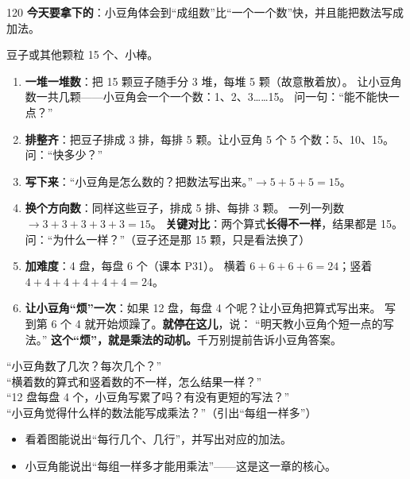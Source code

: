 \begin{lesson}{1}{20}
\textbf{今天要拿下的}：小豆角体会到“成组数”比“一个一个数”快，并且能把数法写成加法。

\begin{materials}
豆子或其他颗粒 15 个、小棒。
\end{materials}

\begin{enumerate}
  \item \textbf{一堆一堆数}：把 15 颗豆子随手分 3 堆，每堆 5 颗（故意散着放）。
        让小豆角数一共几颗——小豆角会一个一个数：1、2、3……15。
        问一句：“能不能快一点？”
  \item \textbf{排整齐}：把豆子排成 3 排，每排 5 颗。让小豆角 5 个 5 个数：5、10、15。
        问：“快多少？”
  \item \textbf{写下来}：“小豆角是怎么数的？把数法写出来。”$\to 5+5+5=15$。
  \item \textbf{换个方向数}：同样这些豆子，排成 5 排、每排 3 颗。
        一列一列数 $\to 3+3+3+3+3=15$。
        \textbf{关键对比}：两个算式\textbf{长得不一样}，结果都是 15。
        问：“为什么一样？”（豆子还是那 15 颗，只是看法换了）
  \item \textbf{加难度}：4 盘，每盘 6 个（课本 P31）。
        横着 $6+6+6+6=24$；竖着 $4+4+4+4+4+4=24$。
  \item \textbf{让小豆角“烦”一次}：如果 12 盘，每盘 4 个呢？让小豆角把算式写出来。
        写到第 6 个 4 就开始烦躁了。\textbf{就停在这儿}，说：
        “明天教小豆角个短一点的写法。”
        \textbf{这个“烦”，就是乘法的动机。}千万别提前告诉小豆角答案。
\end{enumerate}

\begin{saybox}
“小豆角数了几次？每次几个？”\\
“横着数的算式和竖着数的不一样，怎么结果一样？”\\
“12 盘每盘 4 个，小豆角写累了吗？有没有更短的写法？”\\
“小豆角觉得什么样的数法能写成乘法？”（引出“每组一样多”）
\end{saybox}

\begin{passbox}
\begin{itemize}
  \item 看着图能说出“每行几个、几行”，并写出对应的加法。
  \item 小豆角能说出“每组一样多才能用乘法”——这是这一章的核心。
\end{itemize}
\end{passbox}
\end{lesson}

